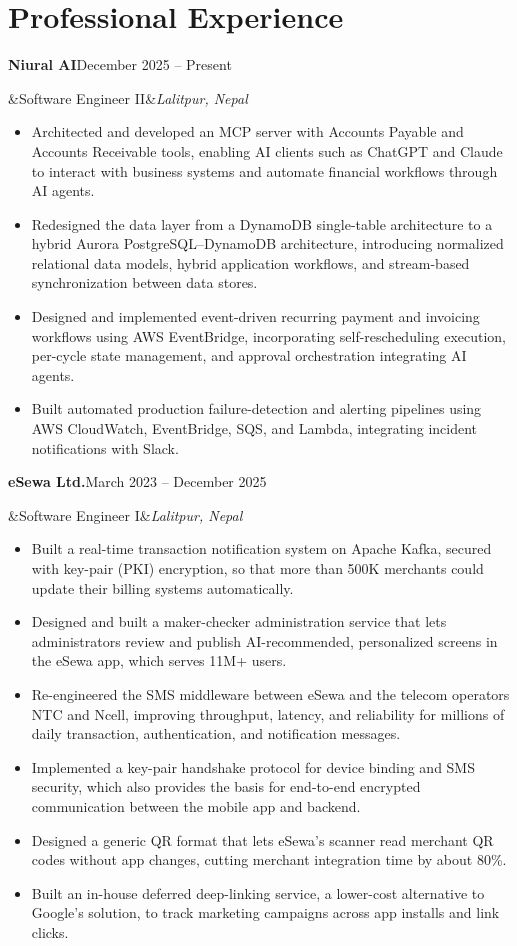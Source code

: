 \documentclass[11pt,letterpaper]{article}
\newcommand{\entry}[4]{%
  \textbf{#1}\hfill #2\par
  \ifx&#3&\else{\itshape #3}\hfill{\itshape\color{muted}#4}\par\fi
  \nopagebreak
}
\newcommand{\gap}{\vspace{0.45em}}
\begin{document}
\section{Professional Experience}
\entry{Niural AI}{December 2025 -- Present}{Software Engineer II}{Lalitpur, Nepal}
\begin{itemize}
  \item Architected and developed an MCP server with Accounts Payable and Accounts Receivable tools,
        enabling AI clients such as ChatGPT and Claude to interact with business systems and automate
        financial workflows through AI agents.
  \item Redesigned the data layer from a DynamoDB single-table architecture to a hybrid Aurora
        PostgreSQL--DynamoDB architecture, introducing normalized relational data models, hybrid
        application workflows, and stream-based synchronization between data stores.
  \item Designed and implemented event-driven recurring payment and invoicing workflows using AWS
        EventBridge, incorporating self-rescheduling execution, per-cycle state management, and
        approval orchestration integrating AI agents.
  \item Built automated production failure-detection and alerting pipelines using AWS CloudWatch,
        EventBridge, SQS, and Lambda, integrating incident notifications with Slack.
\end{itemize}
\gap
\entry{eSewa Ltd.}{March 2023 -- December 2025}{Software Engineer I}{Lalitpur, Nepal}
\begin{itemize}
  \item Built a real-time transaction notification system on Apache Kafka, secured with key-pair (PKI)
        encryption, so that more than 500K merchants could update their billing systems automatically.
  \item Designed and built a maker-checker administration service that lets administrators review and
        publish AI-recommended, personalized screens in the eSewa app, which serves 11M+ users.
  \item Re-engineered the SMS middleware between eSewa and the telecom operators NTC and Ncell, improving
        throughput, latency, and reliability for millions of daily transaction, authentication, and
        notification messages.
  \item Implemented a key-pair handshake protocol for device binding and SMS security, which also
        provides the basis for end-to-end encrypted communication between the mobile app and backend.
  \item Designed a generic QR format that lets eSewa's scanner read merchant QR codes without app
        changes, cutting merchant integration time by about 80\%.
  \item Built an in-house deferred deep-linking service, a lower-cost alternative to Google's solution,
        to track marketing campaigns across app installs and link clicks.
\end{itemize}
\end{document}
